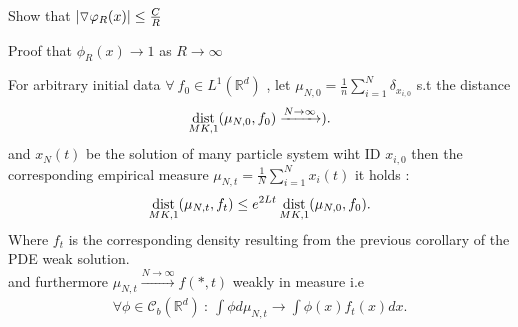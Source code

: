 \begin{exercise}
 Show that $\lvert\triangledown \varphi_R(x)\rvert \le \frac{C}{R}$ 
\end{exercise}
\begin{exercise}
 Proof that $\phi_R(x) \to 1$  as $R\to \infty$
\end{exercise}
\begin{theorem}
  For arbitrary initial data $\forall \ f_{0} \in  L^{1}(\mathbb{R}^{d} ) $ , let $\mu_{N,0} = \frac{1}{n} \sum_{i=1 }^{N} \delta_{x_{i,0}} $
  s.t the distance 
  \begin{align*}
    \operatorname*{dist}_{MK,1}(\mu_{N,0},f_{0}) \xrightarrow{N \to \infty} )
  .\end{align*}
  and $x_N(t)$ be the solution of many particle system wiht ID $x_{i,0}$ then 
  the corresponding empirical measure $\mu_{N,t} = \frac{1}{N} \sum_{i=1 }^{N} x_{i}(t) $ it holds : 
  \begin{align*}
    \operatorname*{dist}_{MK,1}(\mu_{N,t},f_t) \le  e^{2Lt} \operatorname*{dist}_{MK,1}(\mu_{N,0},f_{0}) 
  .\end{align*}
  Where $f_t$ is the corresponding density resulting from the previous corollary of the PDE weak solution.\\[1ex]
  and furthermore $\mu_{N,t} \xrightarrow{N\to \infty} f(*,t)$ weakly in measure i.e 
  \begin{align*}
    \forall  \phi \in \mathcal{C}_b(\mathbb{R}^{d } ) \ : \ \int \phi  d\mu_{N,t} \to  \int \phi(x) f_t(x) dx
  .\end{align*}
\end{theorem}
